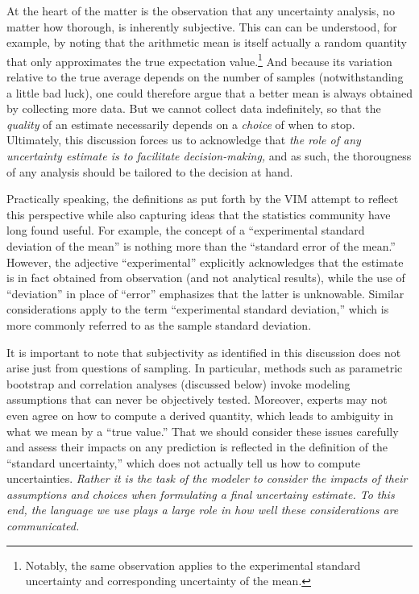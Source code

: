 At the heart of the matter is the observation that any uncertainty analysis, no matter how thorough, is inherently subjective.  This can can be understood, for example, by noting that the arithmetic mean is itself actually a random quantity that only approximates the true expectation value.\footnote{Notably, the same observation applies to the experimental standard uncertainty and corresponding uncertainty of the mean.}  And because its variation relative to the true average depends on the number of samples (notwithstanding a little bad luck), one could therefore argue that a better mean is always obtained by collecting more data.   But we cannot collect data indefinitely, so that the {\it quality} of an estimate necessarily depends on a {\it choice} of when to stop.  Ultimately, this discussion forces us to acknowledge that {\it the role of any uncertainty estimate is to facilitate decision-making,} and as such, the thorougness of any analysis should be tailored to the decision at hand.  

Practically speaking, the definitions as put forth by the VIM attempt to reflect this perspective while also capturing ideas that the statistics community have long found useful.  For example, the concept of a ``experimental standard deviation of the mean'' is nothing more than the ``standard error of the mean.''  However, the adjective ``experimental'' explicitly acknowledges that the estimate is in fact obtained from observation (and not analytical results), while the use of ``deviation'' in place of ``error'' emphasizes that the latter is unknowable.  Similar considerations apply to the term ``experimental standard deviation,'' which is more commonly referred to as the sample standard deviation.

It is important to note that subjectivity as identified in this discussion does not arise just from questions of sampling. In particular, methods such as parametric bootstrap and correlation analyses (discussed below) invoke modeling assumptions that can never be objectively tested.  Moreover, experts may not even agree on how to compute a derived quantity, which leads to ambiguity in what we mean by a ``true value.''\cite{patrone1}  That we should consider these issues carefully and assess their impacts on any prediction is reflected in the definition of the ``standard uncertainty,'' which does not actually tell us how to compute uncertainties.  {\it Rather it is the task of the modeler to consider the impacts of their assumptions and choices when formulating a final uncertainy estimate.  To this end, the language we use plays a large role in how well these considerations are communicated.}


